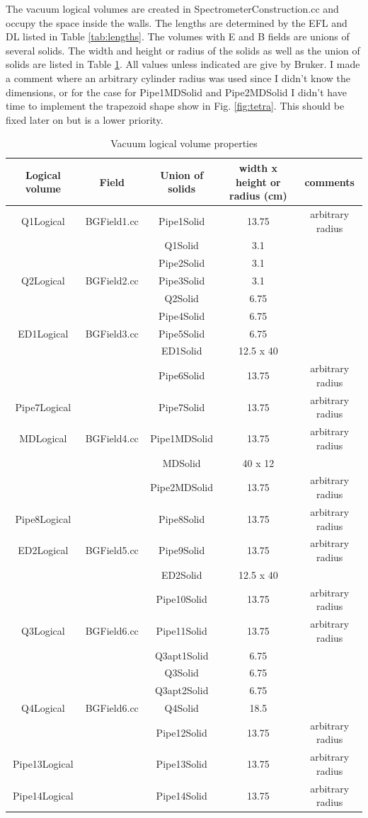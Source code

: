 \documentclass[letter,11pt]{article}
\begin{document}
The vacuum logical volumes are created in SpectrometerConstruction.cc and occupy the space inside the walls. The lengths are determined by the EFL and DL listed in Table \ref{tab:lengths}. The volumes with E and B fields are unions of several solids. The width and height or radius of the solids as well as the union of solids are listed in Table \ref{tab:vac}. All values unless indicated are give by Bruker. I made a comment where an arbitrary cylinder radius was used since I didn't know the dimensions, or for the case for Pipe1MDSolid and Pipe2MDSolid I didn't have time to implement the trapezoid shape show in Fig. \ref{fig:tetra}. This should be fixed later on but is a lower priority.

\begin{table}
\caption{Vacuum logical volume properties}\label{tab:vac}
\centering
\begin{tabular}{ccccc}
\hline
Logical volume	&Field	&Union of solids &width x height or radius (cm)	& comments\\
\hline
Q1Logical	&BGField1.cc	&Pipe1Solid	&13.75	&arbitrary radius\\
		&			&Q1Solid		&3.1		&\\
		&			&Pipe2Solid	&3.1		&\\
Q2Logical	&BGField2.cc	&Pipe3Solid	&3.1		&\\
		&			&Q2Solid		&6.75	&\\
		&			&Pipe4Solid	&6.75	&\\
ED1Logical&BGField3.cc	&Pipe5Solid	&6.75	&\\
		&			&ED1Solid	&12.5 x 40	&\\
		&			&Pipe6Solid	&13.75	&arbitrary radius\\
Pipe7Logical	&		&Pipe7Solid	&13.75	&arbitrary radius\\
MDLogical&BGField4.cc	&Pipe1MDSolid	&13.75	&arbitrary radius\\
		&			&MDSolid		&40 x 12	&\\
		&			&Pipe2MDSolid	&13.75	&arbitrary radius\\
Pipe8Logical	&		&Pipe8Solid	&13.75	&arbitrary radius\\
ED2Logical&BGField5.cc	&Pipe9Solid	&13.75	&arbitrary radius\\
		&			&ED2Solid	&12.5 x 40	&\\
		&			&Pipe10Solid	&13.75	&arbitrary radius\\
Q3Logical	&BGField6.cc	&Pipe11Solid	&13.75	&arbitrary radius\\
		&			&Q3apt1Solid	&6.75	&\\
		&			&Q3Solid		&6.75	&\\
		&			&Q3apt2Solid	&6.75	&\\
Q4Logical	&BGField6.cc	&Q4Solid		&18.5	&\\
		&			&Pipe12Solid	&13.75	&arbitrary radius\\
Pipe13Logical	&		&Pipe13Solid	&13.75	&arbitrary radius\\
Pipe14Logical	&		&Pipe14Solid	&13.75	&arbitrary radius\\
\hline
\end{tabular}
\end{table}
\end{document}
